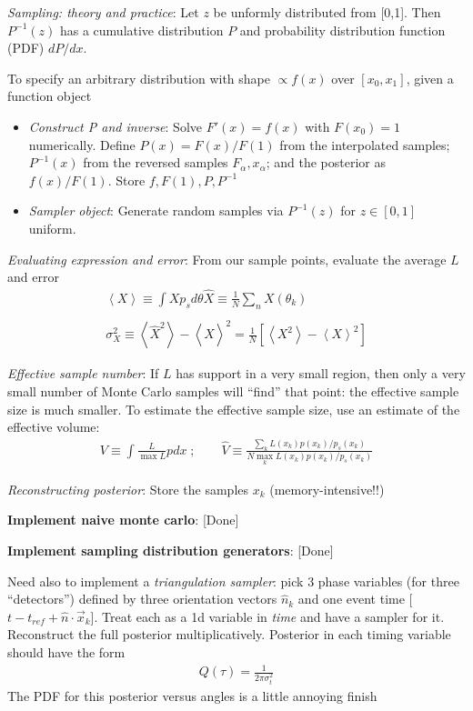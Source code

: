 \documentclass[twocolumn,prd,nofootinbib]{revtex4}
\newcommand\editremark[1]{{\color{red} #1}}
\begin{document}
\begin{widetext}
\emph{Sampling: theory and practice}: Let $z$ be unformly distributed from [0,1]. Then $P^{-1}(z)$ has a cumulative distribution $P$
and probability distribution function (PDF) $dP/dx$.  

To specify an arbitrary distribution with shape $\propto f(x)$ over $[x_0,x_1]$, given a function object
\begin{itemize}
\item \emph{Construct P and inverse}: Solve $F'(x)=f(x)$ with $F(x_0)=1$ numerically.  Define $P(x)=F(x)/F(1)$ from the
  interpolated samples; $P^{-1}(x)$ from the reversed samples $F_\alpha,x_\alpha$; and the posterior as $f(x)/F(1)$.
  Store $f,F(1), P,P^{-1}$
\item \emph{Sampler object}: Generate random samples via $P^{-1}(z)$ for $z\in[0,1]$ uniform.
\end{itemize}

\emph{Evaluating expression and error}: From our sample points, evaluate the average $L$ and error
\begin{eqnarray}
\left< X \right> \equiv \int X p_s d\theta 
\hat{X} \equiv \frac{1}{N} \sum_n X(\theta_k)\\ \\
\sigma_X^2 \equiv \left<\hat{X}^2\right> -\left<\hat{X}\right>^2 
 = \frac{1}{N}[\left<X^2\right> - \left<X\right>^2] 
\end{eqnarray}


\noindent \emph{Effective sample number}: If $L$ has support in a very small region, then only a very small number of
Monte Carlo samples will ``find'' that point: the effective sample size is much smaller.
To estimate the effective sample size, use an estimate of the effective volume:
\begin{eqnarray}
V \equiv \int \frac{L}{\max L} p dx \; ; \qquad  \hat{V} \equiv \frac{\sum_k L(x_k) p(x_k)/p_s(x_k)}{N \max_k L(x_k) p(x_k)/p_s(x_k)}
\end{eqnarray}

\emph{Reconstructing posterior}: Store the samples $x_k$ (memory-intensive!!)

\noindent \textbf{Implement naive monte carlo}: [Done]

\noindent \textbf{Implement sampling distribution generators}: [Done]

Need also to implement a \emph{triangulation sampler}: pick 3 phase variables (for three ``detectors'') defined by three
orientation vectors $\hat{n}_k$ and one event time [$t-t_{ref} +\hat{n}\cdot \vec{x}_k$].  Treat each as a 1d variable
in \emph{time}
and have a sampler for it.  Reconstruct the full posterior multiplicatively.  Posterior in each timing variable should
have the form
\begin{eqnarray}
Q(\tau) = \frac{1}{2\pi \sigma_t^2}
\end{eqnarray}
The PDF for this posterior versus angles is a little annoying \editremark{finish}


\end{widetext}
\end{document}
